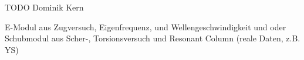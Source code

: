 TODO Dominik Kern

\bigskip

E-Modul aus Zugversuch, Eigenfrequenz, und Wellengeschwindigkeit 
und oder Schubmodul aus Scher-, Torsionsversuch und Resonant Column
(reale Daten, z.B. YS)



